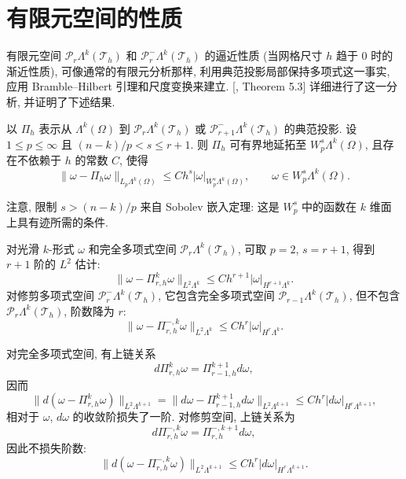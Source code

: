 \section{{有限元空间的性质}}\label{sec:finite-element-space-properties}

{有限元空间 $\mathcal P_r\Lambda^k(\mathcal T_h)$ 和 $\mathcal P_r^-\Lambda^k(\mathcal T_h)$ 的逼近性质 (当网格尺寸 $h$ 趋于 $0$ 时的渐近性质), 可像通常的有限元分析那样, 利用典范投影局部保持多项式这一事实, 应用 Bramble–Hilbert 引理和尺度变换来建立. [, Theorem 5.3] 详细进行了这一分析, 并证明了下述结果.}


\begin{Theorem}\label{thm:canonical-projection-approximation}
{以 $\Pi_h$ 表示从 $\Lambda^k(\Omega)$ 到 $\mathcal P_r\Lambda^k(\mathcal T_h)$ 或 $\mathcal P_{r+1}^-\Lambda^k(\mathcal T_h)$ 的典范投影. 设 $1\leq p\leq\infty$ 且 $(n-k)/p<s\leq r+1$. 则 $\Pi_h$ 可有界地延拓至 $W_p^s\Lambda^k(\Omega)$, 且存在不依赖于 $h$ 的常数 $C$, 使得}
\[
\|\omega-\Pi_h\omega\|_{L_p\Lambda^k(\Omega)}\leq Ch^s|\omega|_{W_p^s\Lambda^k(\Omega)},\qquad\omega\in W_p^s\Lambda^k(\Omega).
\]
\end{Theorem}

{注意, 限制 $s>(n-k)/p$ 来自 Sobolev 嵌入定理: 这是 $W_p^s$ 中的函数在 $k$ 维面上具有迹所需的条件.}

{对光滑 $k$-形式 $\omega$ 和完全多项式空间 $\mathcal P_r\Lambda^k(\mathcal T_h)$, 可取 $p=2$, $s=r+1$, 得到 $r+1$ 阶的 $L^2$ 估计:}
\[
\|\omega-\Pi_{r,h}^k\omega\|_{L^2\Lambda^k}\leq Ch^{r+1}|\omega|_{H^{r+1}\Lambda^k}.
\]
{对修剪多项式空间 $\mathcal P_r^-\Lambda^k(\mathcal T_h)$, 它包含完全多项式空间 $\mathcal P_{r-1}\Lambda^k(\mathcal T_h)$, \newline 但不包含 $\mathcal P_r\Lambda^k(\mathcal T_h)$, 阶数降为 $r$:}
\[
\|\omega-\Pi_{r,h}^{-,k}\omega\|_{L^2\Lambda^k}\leq Ch^r|\omega|_{H^r\Lambda^k}.
\]

{对完全多项式空间, 有上链关系}
\[
d\Pi_{r,h}^k\omega=\Pi_{r-1,h}^{k+1}d\omega,
\]
{因而}
\[
\|d(\omega-\Pi_{r,h}^k\omega)\|_{L^2\Lambda^{k+1}}=\|d\omega-\Pi_{r-1,h}^{k+1}d\omega\|_{L^2\Lambda^{k+1}}\leq Ch^r|d\omega|_{H^r\Lambda^{k+1}},
\]
{相对于 $\omega$, $d\omega$ 的收敛阶损失了一阶. 对修剪空间, 上链关系为}
\[
d\Pi_{r,h}^{-,k}\omega=\Pi_{r,h}^{-,k+1}d\omega,
\]
{因此不损失阶数:}
\[
\|d(\omega-\Pi_{r,h}^{-,k}\omega)\|_{L^2\Lambda^{k+1}}\leq Ch^r|d\omega|_{H^r\Lambda^{k+1}}.
\]

